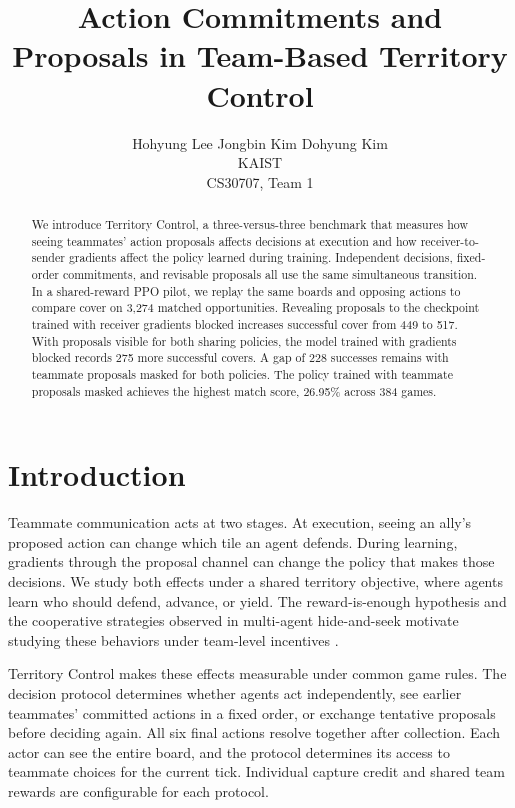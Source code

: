 \documentclass{article}
\title{Action Commitments and Proposals in Team-Based Territory Control}
\author{
  Hohyung Lee \qquad Jongbin Kim \qquad Dohyung Kim \\
  KAIST \\
  CS30707, Team 1
}
\begin{document}
\maketitle

\begin{abstract}
We introduce Territory Control, a three-versus-three benchmark that measures how seeing teammates' action proposals affects decisions at execution and how receiver-to-sender gradients affect the policy learned during training. Independent decisions, fixed-order commitments, and revisable proposals all use the same simultaneous transition. In a shared-reward PPO pilot, we replay the same boards and opposing actions to compare cover on 3,274 matched opportunities. Revealing proposals to the checkpoint trained with receiver gradients blocked increases successful cover from 449 to 517. With proposals visible for both sharing policies, the model trained with gradients blocked records 275 more successful covers. A gap of 228 successes remains with teammate proposals masked for both policies. The policy trained with teammate proposals masked achieves the highest match score, 26.95\% across 384 games.
\end{abstract}

\section{Introduction}

Teammate communication acts at two stages. At execution, seeing an ally's proposed action can change which tile an agent defends. During learning, gradients through the proposal channel can change the policy that makes those decisions. We study both effects under a shared territory objective, where agents learn who should defend, advance, or yield. The reward-is-enough hypothesis and the cooperative strategies observed in multi-agent hide-and-seek motivate studying these behaviors under team-level incentives \citep{silver2021reward,baker2020autocurricula}.

Territory Control makes these effects measurable under common game rules. The decision protocol determines whether agents act independently, see earlier teammates' committed actions in a fixed order, or exchange tentative proposals before deciding again. All six final actions resolve together after collection. Each actor can see the entire board, and the protocol determines its access to teammate choices for the current tick. Individual capture credit and shared team rewards are configurable for each protocol.
\end{document}
